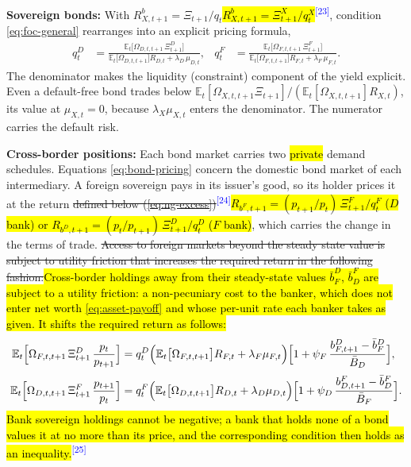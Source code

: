 \documentclass[11pt]{article}
\newcommand{\E}{\mathbb{E}}
\newcommand{\A}[1]{\hl{#1}}
\newcommand{\D}[1]{{\color{red}\st{#1}}}
\newcommand{\chg}[1]{\textsuperscript{\textcolor{blue}{\scriptsize[#1]}}}
\begin{document}
\smallskip\noindent\textbf{Sovereign bonds:} With \D{$R_{X,t+1}^b=\Xi_{t+1}/q_t$}\A{$R^b_{X,t+1}=\Xi^X_{t+1}/q^X_t$}\chg{23}, condition \eqref{eq:foc-general} rearranges into an explicit pricing formula,
\begin{align}
q^{D}_{t}&=\frac{\E_t\bigl[\Omega_{D,t,t+1}\,\Xi^{D}_{t+1}\bigr]}
                 {\E_t\bigl[\Omega_{D,t,t+1}\bigr]R_{D,t}+\lambda_D\,\mu_{D,t}},
&
q^{F}_{t}&=\frac{\E_t\bigl[\Omega_{F,t,t+1}\,\Xi^{F}_{t+1}\bigr]}
                 {\E_t\bigl[\Omega_{F,t,t+1}\bigr]R_{F,t}+\lambda_F\,\mu_{F,t}} .
\label{eq:bond-pricing}
\end{align}
The denominator makes the liquidity (constraint) component of the yield explicit. Even a default-free bond trades below $\E_t[\Omega_{X,t,t+1}\Xi_{t+1}]/(\E_t[\Omega_{X,t,t+1}]R_{X,t})$, its value at $\mu_{X,t}=0$, because $\lambda_X\mu_{X,t}$ enters the denominator. The numerator carries the default risk.

\smallskip\noindent\textbf{Cross-border positions:} Each bond market carries two \A{private} demand schedules. Equations \eqref{eq:bond-pricing} concern the domestic bond market of each intermediary. A foreign sovereign pays in its issuer's good, so its holder prices it at the return \D{defined below (\ref{eq:ng-excess})}\chg{24}\A{$R_{b^F,t+1}=(p_{t+1}/p_t)\,\Xi^F_{t+1}/q^F_t$ ($D$ bank) or $R_{b^D,t+1}=(p_t/p_{t+1})\,\Xi^D_{t+1}/q^D_t$ ($F$ bank)}, which carries the change in the terms of trade. \D{Access to foreign markets beyond the steady state value is subject to utility friction that increases the required return in the following fashion:}\A{Cross-border holdings away from their steady-state values $\bar b^D_F$, $\bar b^F_D$ are subject to a utility friction: a non-pecuniary cost to the banker, which does not enter net worth {\eqref{eq:asset-payoff}} and whose per-unit rate each banker takes as given. It shifts the required return as follows:}
\begin{align}
\E_t\Bigl[\Omega_{F,t,t+1}\,\Xi^{D}_{t+1}\,\frac{p_t}{p_{t+1}}\Bigr]
&=q^{D}_{t}\Bigl(\E_t\bigl[\Omega_{F,t,t+1}\bigr]R_{F,t}+\lambda_F\mu_{F,t}\Bigr)
  \Bigl[1+\psi_F\,\frac{b^{D}_{F,t+1}-\bar b^{D}_{F}}{\bar B_D}\Bigr],
\label{eq:bondD-foreign}\\[3pt]
\E_t\Bigl[\Omega_{D,t,t+1}\,\Xi^{F}_{t+1}\,\frac{p_{t+1}}{p_t}\Bigr]
&=q^{F}_{t}\Bigl(\E_t\bigl[\Omega_{D,t,t+1}\bigr]R_{D,t}+\lambda_D\mu_{D,t}\Bigr)
  \Bigl[1+\psi_D\,\frac{b^{F}_{D,t+1}-\bar b^{F}_{D}}{\bar B_F}\Bigr].
\label{eq:bondF-foreign}
\end{align}
\A{Bank sovereign holdings cannot be negative; a bank that holds none of a bond values it at no more than its price, and the corresponding condition then holds as an inequality.}\chg{25}
\end{document}
